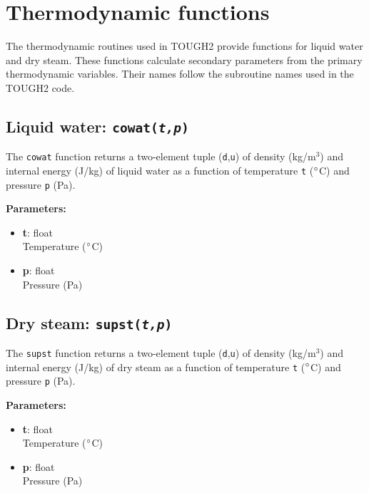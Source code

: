 \section{Thermodynamic functions}

The thermodynamic routines used in TOUGH2 provide functions for liquid water and dry steam.  These functions calculate secondary parameters from the primary thermodynamic variables.  Their names follow the subroutine names used in the TOUGH2 code.

\begin{snugshade}
\subsection{Liquid water: \texttt{cowat(\emph{t,p})}}
\end{snugshade}
\label{sec:t2thermo:cowat}

The \texttt{cowat} function returns a two-element tuple (\texttt{d},\texttt{u}) of density (kg/m$^3$) and internal energy (J/kg) of liquid water as a function of temperature \texttt{t} ($\degree$C) and pressure \texttt{p} (Pa).

\textbf{Parameters:}
\begin{itemize}
\item \textbf{t}: float\\
  Temperature ($\degree$C)
\item \textbf{p}: float\\
  Pressure (Pa)
\end{itemize}

\begin{snugshade}
\subsection{Dry steam: \texttt{supst(\emph{t,p})}}
\end{snugshade}
\label{sec:t2thermo:supst}

The \texttt{supst} function returns a two-element tuple (\texttt{d},\texttt{u}) of density (kg/m$^3$) and internal energy (J/kg) of dry steam as a function of temperature \texttt{t} ($\degree$C) and pressure \texttt{p} (Pa).

\textbf{Parameters:}
\begin{itemize}
\item \textbf{t}: float\\
  Temperature ($\degree$C)
\item \textbf{p}: float\\
  Pressure (Pa)
\end{itemize}

